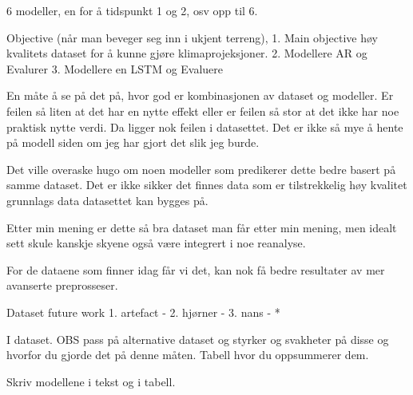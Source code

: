 6 modeller, en for å tidspunkt 1 og 2, osv opp til 6.


Objective (når man beveger seg inn i ukjent terreng), 
1. Main objective høy kvalitets dataset for å kunne gjøre klimaprojeksjoner. 
2. Modellere AR og Evalurer
3. Modellere en LSTM og Evaluere


En måte å se på det på, hvor god er kombinasjonen av dataset og modeller. Er feilen så liten at det har en nytte effekt eller er feilen så stor at det ikke har noe praktisk nytte verdi. Da ligger nok feilen i datasettet. Det er ikke så mye å hente på modell siden om jeg har gjort det slik jeg burde.

Det ville overaske hugo om noen modeller som predikerer dette bedre basert på samme dataset. Det er ikke sikker det finnes data som er tilstrekkelig høy kvalitet grunnlags data datasettet kan bygges på.

Etter min mening er dette så bra dataset man får etter min mening, men idealt sett skule kanskje skyene også være integrert i noe reanalyse. 

For de dataene som finner idag får vi det, kan nok få bedre resultater av mer avanserte preprosseser.

Dataset future work
1. artefact -
2. hjørner -
3. nans -
  * 
  
I dataset. 
OBS pass på alternative dataset og styrker og svakheter på disse og hvorfor du gjorde det på denne måten. 
Tabell hvor du oppsummerer dem.

Skriv modellene i tekst og i tabell. 